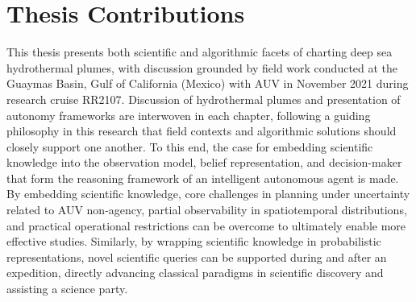 \section{Thesis Contributions}
\label{sec:intro_contributions}
This thesis presents both scientific and algorithmic facets of charting deep sea hydrothermal plumes, with discussion grounded by field work conducted at the Guaymas Basin, Gulf of California (Mexico) with AUV \Sentry in November 2021 during research cruise RR2107.
Discussion of hydrothermal plumes and presentation of autonomy frameworks are interwoven in each chapter, following a guiding philosophy in this research that field contexts and algorithmic solutions should closely support one another.
To this end, the case for embedding scientific knowledge into the observation model, belief representation, and decision-maker that form the reasoning framework of an intelligent autonomous agent is made.
By embedding scientific knowledge, core challenges in planning under uncertainty related to AUV non-agency, partial observability in spatiotemporal distributions, and practical operational restrictions can be overcome to ultimately enable more effective studies. 
Similarly, by wrapping scientific knowledge in probabilistic representations, novel scientific queries can be supported during and after an expedition, directly advancing classical paradigms in scientific discovery and assisting a science party.

